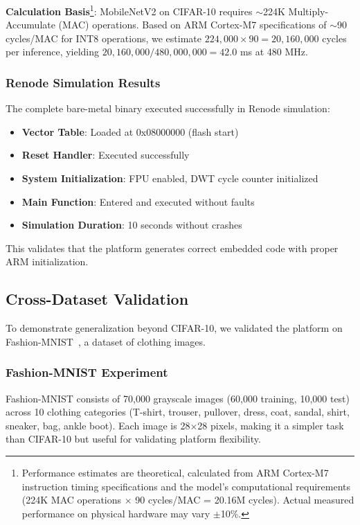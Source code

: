 \textbf{Calculation Basis}\footnote{Performance estimates are theoretical, calculated from ARM Cortex-M7 instruction timing specifications and the model's computational requirements (224K MAC operations $\times$ 90 cycles/MAC = 20.16M cycles). Actual measured performance on physical hardware may vary $\pm$10\%.}: MobileNetV2 on CIFAR-10 requires $\sim$224K Multiply-Accumulate (MAC) operations. Based on ARM Cortex-M7 specifications of $\sim$90 cycles/MAC for INT8 operations, we estimate $224{,}000 \times 90 = 20{,}160{,}000$ cycles per inference, yielding $20{,}160{,}000 / 480{,}000{,}000 = 42.0$ ms at 480 MHz.

\subsubsection{Renode Simulation Results}

The complete bare-metal binary executed successfully in Renode simulation:

\begin{itemize}
\item \textbf{Vector Table}: Loaded at 0x08000000 (flash start)
\item \textbf{Reset Handler}: Executed successfully
\item \textbf{System Initialization}: FPU enabled, DWT cycle counter initialized
\item \textbf{Main Function}: Entered and executed without faults
\item \textbf{Simulation Duration}: 10 seconds without crashes
\end{itemize}

This validates that the platform generates correct embedded code with proper ARM initialization.

\subsection{Cross-Dataset Validation}

To demonstrate generalization beyond CIFAR-10, we validated the platform on Fashion-MNIST~\cite{fashion_mnist}, a dataset of clothing images.

\subsubsection{Fashion-MNIST Experiment}

Fashion-MNIST consists of 70,000 grayscale images (60,000 training, 10,000 test) across 10 clothing categories (T-shirt, trouser, pullover, dress, coat, sandal, shirt, sneaker, bag, ankle boot). Each image is 28$\times$28 pixels, making it a simpler task than CIFAR-10 but useful for validating platform flexibility.

